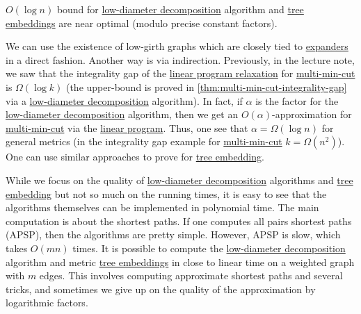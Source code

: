 \begin{remark}
	\(O(\log n)\) bound for \hyperref[def:low-diameter-decomposition]{low-diameter decomposition} algorithm and \hyperref[prb:tree-embedding]{tree embeddings} are near optimal (modulo precise constant factors).
\end{remark}
\begin{explanation}
	We can use the existence of low-girth graphs which are closely tied to \hyperref[def:expander]{expanders} in a direct fashion. Another way is via indirection. Previously, in the lecture note, we saw that the integrality gap of the \hyperref[eq:multi-min-cut-LP]{linear program relaxation} for \hyperref[prb:multi-min-cut]{multi-min-cut} is \(\Omega (\log k)\) (the upper-bound is proved in \autoref{thm:multi-min-cut-integrality-gap} via a \hyperref[def:low-diameter-decomposition]{low-diameter decomposition} algorithm). In fact, if \(\alpha \) is the factor for the \hyperref[def:low-diameter-decomposition]{low-diameter decomposition} algorithm, then we get an \(O(\alpha )\)-approximation for \hyperref[prb:multi-min-cut]{multi-min-cut} via the \hyperref[eq:multi-min-cut-LP]{linear program}. Thus, one see that \(\alpha = \Omega (\log n)\) for general metrics (in the integrality gap example for \hyperref[prb:multi-min-cut]{multi-min-cut} \(k = \Omega (n^2)\)). One can use similar approaches to prove for \hyperref[prb:tree-embedding]{tree embedding}.
\end{explanation}

\begin{note}
	While we focus on the quality of \hyperref[def:low-diameter-decomposition]{low-diameter decomposition} algorithms and \hyperref[prb:tree-embedding]{tree embedding} but not so much on the running times, it is easy to see that the algorithms themselves can be implemented in polynomial time. The main computation is about the shortest paths. If one computes all pairs shortest paths (APSP), then the algorithms are pretty simple. However, APSP is slow, which takes \(O(mn)\) times. It is possible to compute the \hyperref[def:low-diameter-decomposition]{low-diameter decomposition} algorithm and metric \hyperref[prb:tree-embedding]{tree embeddings} in close to linear time on a weighted graph with \(m\) edges. This involves computing approximate shortest paths and several tricks, and sometimes we give up on the quality of the approximation by logarithmic factors.
\end{note}